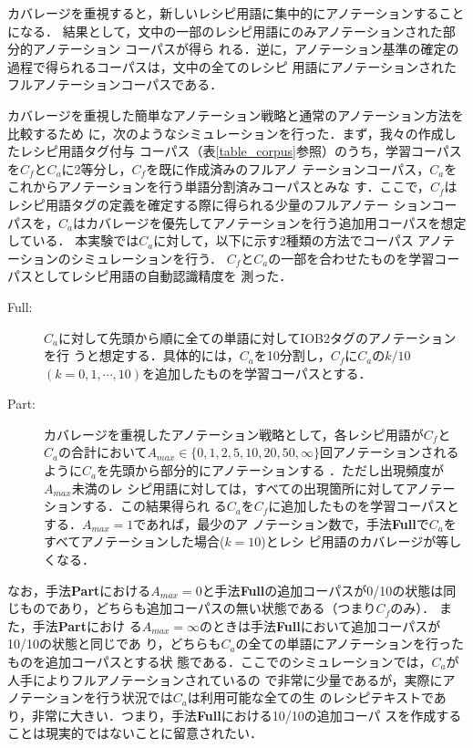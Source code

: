 \documentclass[japanese]{jnlp_1.4}
\begin{document}
カバレージを重視すると，新しいレシピ用語に集中的にアノテーションすることになる．
結果として，文中の一部のレシピ用語にのみアノテーションされた部分的アノテーション
コーパス\cite{Word-based.Partial.Annotation.for.Efficient.Corpus.Construction}が得ら
れる．逆に，アノテーション基準の確定の過程で得られるコーパスは，文中の全てのレシピ
用語にアノテーションされたフルアノテーションコーパスである．

カバレージを重視した簡単なアノテーション戦略と通常のアノテーション方法を比較するため
に，次のようなシミュレーションを行った．まず，我々の作成したレシピ用語タグ付与
コーパス（表\ref{table_corpus}参照）のうち，学習コーパスを$C_f$と$C_a$に2等分し，$C_f$を既に作成済みのフルアノ
テーションコーパス，$C_a$をこれからアノテーションを行う単語分割済みコーパスとみな
す．ここで，$C_f$はレシピ用語タグの定義を確定する際に得られる少量のフルアノテー
ションコーパスを，$C_a$はカバレージを優先してアノテーションを行う追加用コーパスを想定
している．
本実験では$C_a$に対して，以下に示す2種類の方法でコーパス
アノテーションのシミュレーションを行う．
$C_f$と$C_a$の一部を合わせたものを学習コーパスとしてレシピ用語の自動認識精度を
測った．
\begin{description}

\item [Full:] $C_a$に対して先頭から順に全ての単語に対してIOB2タグのアノテーションを行
  うと想定する．具体的には，$C_a$を10分割し，$C_f$に$C_a$の$k/10$ $(k = 0, 1,
  \cdots, 10)$を追加したものを学習コーパスとする．

\item [Part:] カバレージを重視したアノテーション戦略として，各レシピ用語が$C_f$と
  $C_a$の合計において$A_{max} \in \{0,1,2,5,10,20,50,\infty\}$回アノテーションされる
  ように$C_a$を先頭から部分的にアノテーションする
．ただし出現頻度が$A_{max}$未満のレ
  シピ用語に対しては，すべての出現箇所に対してアノテーションする．この結果得られ
  る$C_a$を$C_f$に追加したものを学習コーパスとする．$A_{max} = 1$であれば，最少のア
  ノテーション数で，手法{\bf Full}で$C_a$をすべてアノテーションした場合($k=10$)とレシ
  ピ用語のカバレージが等しくなる．
\end{description}
なお，手法{\bf Part}における$A_{max}=0$と手法{\bf Full}の追加コーパスが0/10の状態は同
じものであり，どちらも追加コーパスの無い状態である（つまり$C_f$のみ）．
また，手法{\bf Part}におけ
る$A_{max} = \infty$のときは手法{\bf Full}において追加コーパスが10/10の状態と同じであ
り，どちらも$C_a$の全ての単語にアノテーションを行ったものを追加コーパスとする状
態である．ここでのシミュレーションでは，$C_a$が人手によりフルアノテーションされているの
で非常に少量であるが，実際にアノテーションを行う状況では$C_a$は利用可能な全ての生
のレシピテキストであり，非常に大きい．つまり，手法{\bf Full}における10/10の追加コーパ
スを作成することは現実的ではないことに留意されたい．
\end{document}
